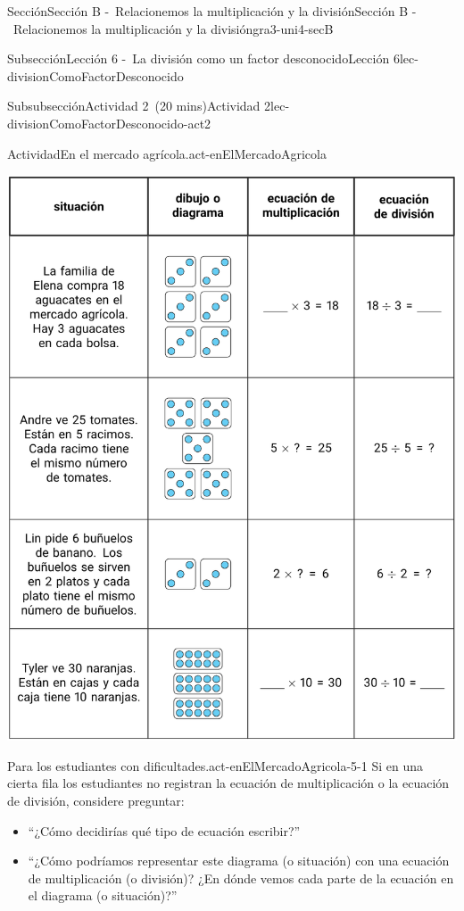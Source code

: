 \documentclass[oneside,10pt,]{article}
\begin{document}
\begin{sectionptx}{Sección}{Sección B -~Relacionemos la multiplicación y la división}{}{Sección B -~Relacionemos la multiplicación y la división}{}{}{gra3-uni4-secB}
\begin{subsectionptx}{Subsección}{Lección 6 -~La división como un factor desconocido}{}{Lección 6}{}{}{lec-divisionComoFactorDesconocido}
\begin{subsubsectionptx}{Subsubsección}{Actividad 2~(20 mins)}{}{Actividad 2}{}{}{lec-divisionComoFactorDesconocido-act2}
\begin{activity}{Actividad}{En el mercado agrícola.}{act-enElMercadoAgricola}
\begin{image}{0}{1}{0}{}
\includegraphics[width=\linewidth]{external/tikz-source/enElMercadoAgricola-tab-sol.pdf}
\end{image}%
\end{activity}%
%
\par
\begin{paragraphs}{Para los estudiantes con dificultades.}{act-enElMercadoAgricola-5-1}%
Si en una cierta fila los estudiantes no registran la ecuación de multiplicación o la ecuación de división, considere preguntar:%
%
\begin{itemize}[label=\textbullet]
\item{}``¿Cómo decidirías qué tipo de ecuación escribir?''%
\item{}``¿Cómo podríamos representar este diagrama (o situación) con una ecuación de multiplicación (o división)? ¿En dónde vemos cada parte de la ecuación en el diagrama (o situación)?''%
\end{itemize}
\end{paragraphs}%

\end{subsubsectionptx}
\end{subsectionptx}
\end{sectionptx}
\end{document}
